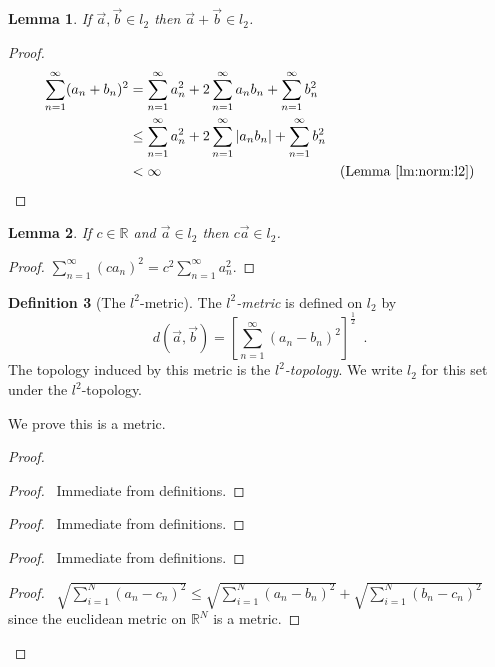 \documentclass{report}
\let\qed\relax
\newtheorem{lm}{Lemma}[section]
\theoremstyle{definition}
\newtheorem{df}[lm]{Definition}
\begin{document}
  \begin{lm}
    If $\vec{a}, \vec{b} \in l_2$ then $\vec{a} + \vec{b} \in l_2$.
  \end{lm}

  \begin{proof}
    \pf
    \begin{align*}
      \sum_{n=1}^\infty (a_n + b_n)^2 & = \sum_{n=1}^\infty a_n^2 + 2
      \sum_{n=1}^\infty a_n b_n + \sum_{n=1}^\infty b_n^2 \\
      & \leq \sum_{n=1}^\infty a_n^2 + 2 \sum_{n=1}^\infty |a_n b_n| +
      \sum_{n=1}^\infty b_n^2 \\
      & < \infty & (\text{Lemma \ref{lm:norm:l2}})
    \end{align*}
    \qed
  \end{proof}

  \begin{lm}
    If $c \in \mathbb{R}$ and $\vec{a} \in l_2$ then $c \vec{a} \in l_2$.
  \end{lm}

  \begin{proof}
    \pf $\sum_{n=1}^\infty (c a_n)^2 = c^2 \sum_{n=1}^\infty a_n^2$. \qed
  \end{proof}

  \begin{df}[The $l^2$-metric]
    The \emph{$l^2$-metric} is defined on $l_2$ by
    \[ d(\vec{a}, \vec{b}) = \left[ \sum_{n=1}^\infty (a_n -
    b_n)^2 \right]^{\frac{1}{2}} \enspace . \] The topology induced by this
    metric
    is the \emph{$l^2$-topology}. We write $l_2$ for this set under the
    $l^2$-topology.

    We prove this is a metric.
  \end{df}

  \begin{proof}
    \pf
    \begin{proof}
      \pf\ Immediate from definitions.
    \end{proof}
    \begin{proof}
      \pf\ Immediate from definitions.
    \end{proof}
    \begin{proof}
      \pf\ Immediate from definitions.
    \end{proof}
    \begin{proof}
      \pf\ $\sqrt{\sum_{i=1}^N (a_n - c_n)^2}  \leq \sqrt{\sum_{i=1}^N (a_n
        - b_n)^2} + \sqrt{\sum_{i=1}^N (b_n - c_n)^2}$ since the euclidean
      metric on $\mathbb{R}^N$ is a metric.
    \end{proof}
    \qed
  \end{proof}
\end{document}
